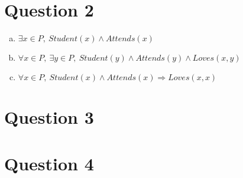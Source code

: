 \documentclass[12pt]{article}
\begin{document}
\section*{Question 2}
\begin{enumerate}[a.]
    \item

    $\exists x \in P,\: Student(x) \land Attends(x)$

    \item

    $\forall x \in P,\:\exists y \in P,\:Student(y) \land Attends(y) \land Loves(x,y)$

    \item

    $\forall x \in P,\: Student(x) \land Attends(x) \Rightarrow Loves(x,x)$

\end{enumerate}


\section*{Question 3}

\section*{Question 4}
\end{document}
